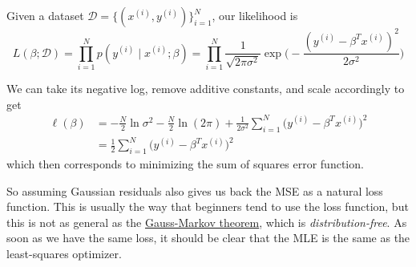   \begin{lemma}[Likelihood]
    \label{thm:likelihood}
    Given a dataset $\mathcal{D} = \{(x^{(i)}, y^{(i)})\}_{i=1}^N$, our likelihood is 
    \begin{equation}
      L(\beta ; \mathcal{D}) = \prod_{i=1}^N p(y^{(i)} \mid x^{(i)}; \beta) = \prod_{i=1}^N \frac{1}{\sqrt{2 \pi \sigma^2}} \exp \bigg( -\frac{(y^{(i)} - \beta^T x^{(i)})^2}{2 \sigma^2} \bigg)
    \end{equation}
  \end{lemma} 

  \begin{theorem}
    \label{thm:negative-log-likelihood-is-mse-loss}
    We can take its negative log, remove additive constants, and scale accordingly to get 
    \begin{align}
      \ell (\beta) & = -\frac{N}{2} \ln{\sigma^2} - \frac{N}{2} \ln(2 \pi) + \frac{1}{2 \sigma^2} \sum_{i=1}^N \big(y^{(i)} - \beta^T x^{(i)} \big)^2 \\
      & =\frac{1}{2} \sum_{i=1}^N \big(y^{(i)} - \beta^T x^{(i)} \big)^2 
    \end{align}
    which then corresponds to minimizing the sum of squares error function. 
  \end{theorem}

  So assuming Gaussian residuals also gives us back the MSE as a natural loss function. This is usually the way that beginners tend to use the loss function, but this is not as general as the \hyperref[thm:gauss-markov-theorem]{Gauss-Markov theorem}, which is \textit{distribution-free}. As soon as we have the same loss, it should be clear that the MLE is the same as the least-squares optimizer. 

